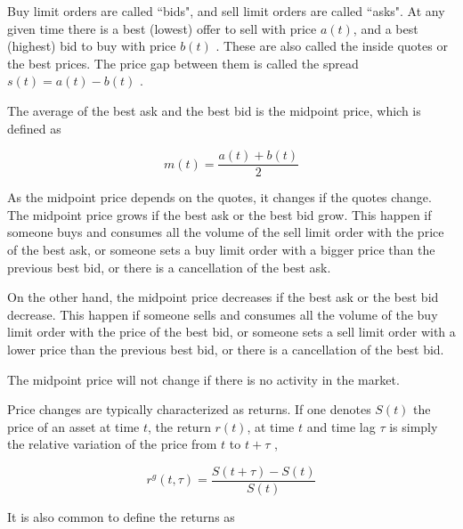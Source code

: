 Buy limit orders are called ``bids", and sell limit orders are called ``asks".
At any given time there is a best (lowest) offer to sell with price
$a\left(t\right)$, and a best (highest) bid to buy with price
$b\left(t\right)$ \cite{subtle_nature}. These are also called the inside quotes
or the best prices. The price gap between them is called the spread
$s\left(t\right) = a\left(t\right)-b\left(t\right)$
\cite{subtle_nature,Bouchaud_2004,large_prices_changes}.

The average of the best ask and the best bid is the midpoint price, which is
defined as \cite{subtle_nature,Bouchaud_2004,large_prices_changes}

\begin{equation}\label{eq:midpoint_price}
    m\left(t\right)=\frac{a\left(t\right)+b\left(t\right)}{2}
\end{equation}

As the midpoint price depends on the quotes, it changes if the quotes change.
The midpoint price grows if the best ask or the best bid grow. This happen if
someone buys and consumes all the volume of the sell limit order with the price
of the best ask, or someone sets a buy limit order with a bigger price than the
previous best bid, or there is a cancellation of the best ask.

On the other hand, the midpoint price decreases if the best ask or the best bid
decrease. This happen if someone sells and consumes all the volume of the buy
limit order with the price of the best bid, or someone sets a sell limit order
with a lower price than the previous best bid, or there is a cancellation of
the best bid.

The midpoint price will not change if there is no activity in the market.

Price changes are typically characterized as returns. If one denotes
$S\left( t\right)$ the price of an asset at time $t$, the return
$r\left(t\right)$, at time $t$ and time lag $\tau$ is simply the relative
variation of the price from $t$ to $t + \tau$
\cite{subtle_nature,empirical_facts,asynchrony_effects_corr,tick_size_impact,causes_epps_effect},

\begin{equation}\label{eq:return_general}
    r^{g} \left(t, \tau \right) = \frac{S\left(t + \tau\right)
    - S\left(t\right)}{S\left(t\right)}
\end{equation}

It is also common to define the returns as
\cite{dissecting_cross,subtle_nature,empirical_facts,empirical_properties,large_prices_changes,theory_market_impact,spread_changes_affect,fluctions_market_friction}

